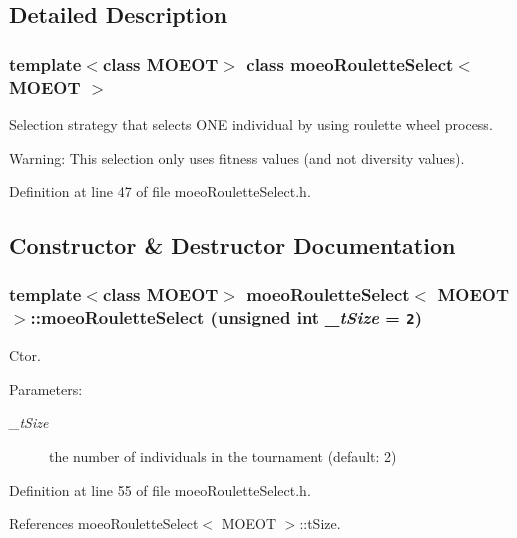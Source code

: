 \subsection{Detailed Description}
\subsubsection*{template$<$class MOEOT$>$ class moeo\-Roulette\-Select$<$ MOEOT $>$}

Selection strategy that selects ONE individual by using roulette wheel process. 

\begin{Desc}
\item[Warning:]This selection only uses fitness values (and not diversity values). \end{Desc}




Definition at line 47 of file moeo\-Roulette\-Select.h.

\subsection{Constructor \& Destructor Documentation}
\subsubsection{\setlength{\rightskip}{0pt plus 5cm}template$<$class MOEOT$>$ \bf{moeo\-Roulette\-Select}$<$ MOEOT $>$::\bf{moeo\-Roulette\-Select} (unsigned int {\em \_\-t\-Size} = {\tt 2})\hspace{0.3cm}{\tt  [inline]}}\label{classmoeoRouletteSelect_4caa45f4c9d1ad2949cc14d2c21b77ea}


Ctor. 

\begin{Desc}
\item[Parameters:]
\begin{description}
\item[{\em \_\-t\-Size}]the number of individuals in the tournament (default: 2) \end{description}
\end{Desc}


Definition at line 55 of file moeo\-Roulette\-Select.h.

References moeo\-Roulette\-Select$<$ MOEOT $>$::t\-Size.

